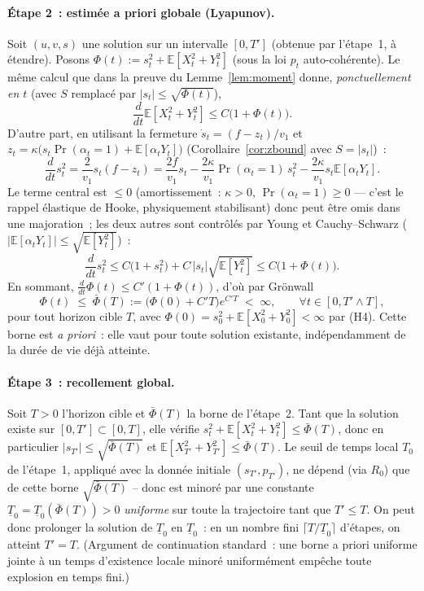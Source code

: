 \documentclass[11pt,a4paper]{article}
\newcommand{\E}{\mathbb{E}}
\theoremstyle{plain}
\theoremstyle{definition}
\begin{document}
\paragraph{\'Etape 2~: estim\'ee a priori globale (Lyapunov).} Soit $(u,v,s)$ une solution sur un intervalle $[0,T']$ (obtenue par l'\'etape~1, \`a \'etendre). Posons $\Phi(t):=s_t^2+\E[X_t^2+Y_t^2]$ (sous la loi $p_t$ auto-coh\'erente). Le m\^eme calcul que dans la preuve du Lemme~\ref{lem:moment} donne, \emph{ponctuellement en $t$} (avec $S$ remplac\'e par $|s_t|\le\sqrt{\Phi(t)}$),
\[
\frac{d}{dt}\E[X_t^2+Y_t^2] \le C\big(1+\Phi(t)\big).
\]
D'autre part, en utilisant la fermeture $\dot s_t=(f-z_t)/v_1$ et $z_t=\kappa\big(s_t\Pr(\alpha_t=1)+\E[\alpha_tY_t]\big)$ (Corollaire~\ref{cor:zbound} avec $S=|s_t|$)~:
\[
\frac{d}{dt}s_t^2 = \frac{2}{v_1}s_t(f-z_t) = \frac{2f}{v_1}s_t -\frac{2\kappa}{v_1}\Pr(\alpha_t=1)\,s_t^2 -\frac{2\kappa}{v_1}s_t\E[\alpha_tY_t].
\]
Le terme central est $\le0$ (amortissement~: $\kappa>0$, $\Pr(\alpha_t=1)\ge0$ --- c'est le rappel \'elastique de Hooke, physiquement stabilisant) donc peut \^etre omis dans une majoration~; les deux autres sont contr\^ol\'es par Young et Cauchy--Schwarz ($|\E[\alpha_tY_t]|\le\sqrt{\E[Y_t^2]}$)~:
\[
\frac{d}{dt}s_t^2 \le C\big(1+s_t^2\big) + C\,|s_t|\sqrt{\E[Y_t^2]} \le C\big(1+\Phi(t)\big).
\]
En sommant, $\frac{d}{dt}\Phi(t)\le C'(1+\Phi(t))$, d'o\`u par Gr\"onwall
\[
\Phi(t) \;\le\; \bar\Phi(T):=\big(\Phi(0)+C'T\big)e^{C'T} \;<\;\infty, \qquad \forall t\in[0,T'\wedge T],
\]
pour tout horizon cible $T$, avec $\Phi(0)=s_0^2+\E[X_0^2+Y_0^2]<\infty$ par (H4). Cette borne est \emph{a priori}~: elle vaut pour toute solution existante, ind\'ependamment de la dur\'ee de vie d\'ej\`a atteinte.

\paragraph{\'Etape 3~: recollement global.} Soit $T>0$ l'horizon cible et $\bar\Phi(T)$ la borne de l'\'etape~2. Tant que la solution existe sur $[0,T']\subset[0,T]$, elle v\'erifie $s_t^2+\E[X_t^2+Y_t^2]\le\bar\Phi(T)$, donc en particulier $|s_{T'}|\le\sqrt{\bar\Phi(T)}$ et $\E[X_{T'}^2+Y_{T'}^2]\le\bar\Phi(T)$. Le seuil de temps local $T_0$ de l'\'etape~1, appliqu\'e avec la donn\'ee initiale $(s_{T'},p_{T'})$, ne d\'epend (via $R_0$) que de cette borne $\sqrt{\bar\Phi(T)}$ -- donc est minor\'e par une constante $\underline{T}_0=\underline T_0(\bar\Phi(T))>0$ \emph{uniforme} sur toute la trajectoire tant que $T'\le T$. On peut donc prolonger la solution de $\underline T_0$ en $\underline T_0$~: en un nombre fini $\lceil T/\underline T_0\rceil$ d'\'etapes, on atteint $T' = T$. (Argument de continuation standard~: une borne a priori uniforme jointe \`a un temps d'existence locale minor\'e uniform\'ement emp\^eche toute explosion en temps fini.)
\end{document}
